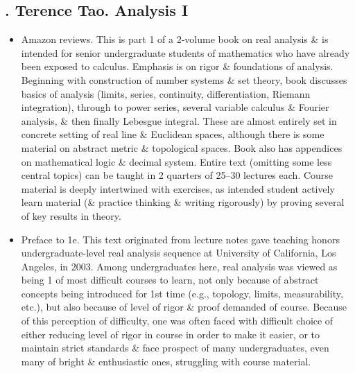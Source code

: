 \documentclass{article}
\begin{document}
\subsection{\cite{Tao_analysis_1}. {\sc Terence Tao}. Analysis I}
{}
\begin{itemize}
	\item {\sf Amazon reviews.} This is part 1 of a 2-volume book on real analysis \& is intended for senior undergraduate students of mathematics who have already been exposed to calculus. Emphasis is on rigor \& foundations of analysis. Beginning with construction of number systems \& set theory, book discusses basics of analysis (limits, series, continuity, differentiation, Riemann integration), through to power series, several variable calculus \& Fourier analysis, \& then finally Lebesgue integral. These are almost entirely set in concrete setting of real line \& Euclidean spaces, although there is some material on abstract metric \& topological spaces. Book also has appendices on mathematical logic \& decimal system. Entire text (omitting some less central topics) can be taught in 2 quarters of 25--30 lectures each. Course material is deeply intertwined with exercises, as intended student actively learn material (\& practice thinking \& writing rigorously) by proving several of key results in theory.
	\item {\sf Preface to 1e.} This text originated from lecture notes gave teaching honors undergraduate-level real analysis sequence at University of California, Los Angeles, in 2003. Among undergraduates here, real analysis was viewed as being 1 of most difficult courses to learn, not only because of abstract concepts being introduced for 1st time (e.g., topology, limits, measurability, etc.), but also because of level of rigor \& proof demanded of course. Because of this perception of difficulty, one was often faced with difficult choice of either reducing level of rigor in course in order to make it easier, or to maintain strict standards \& face prospect of many undergraduates, even many of bright \& enthusiastic ones, struggling with course material.
	

\end{itemize}
\end{document}
